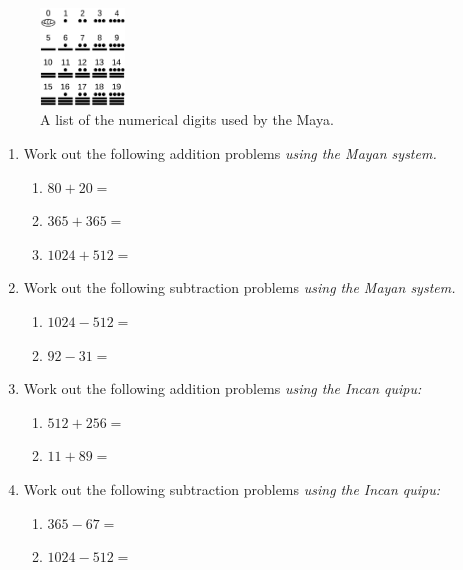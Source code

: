\documentclass[10pt]{article}
\begin{document}
\begin{figure}[hb]
\centering
\includegraphics[width=0.2\textwidth]{figures/maya_digits.png}
\caption{\label{fig:digits} A list of the numerical digits used by the Maya.}
\end{figure}
\begin{enumerate}
\item Work out the following addition problems \textit{using the Mayan system.}
\begin{enumerate}
\item $80 + 20 = $ \vspace{2cm}
\item $365 + 365 = $ \vspace{2cm}
\item $1024 + 512 = $ \vspace{2cm}
\end{enumerate}
\item Work out the following subtraction problems \textit{using the Mayan system.}
\begin{enumerate}
\item $1024 - 512 = $ \vspace{2cm}
\item $92 - 31 = $ \vspace{2cm}
\end{enumerate}
\item Work out the following addition problems \textit{using the Incan quipu:}
\begin{enumerate}
\item $512 + 256 = $ \vspace{2cm}
\item $11 + 89 = $ \vspace{2cm}
\end{enumerate}
\item Work out the following subtraction problems \textit{using the Incan quipu:}
\begin{enumerate}
\item $365 - 67 = $ \vspace{2cm}
\item $1024 - 512 = $ \vspace{2cm}
\end{enumerate}

\end{enumerate}
\end{document}
